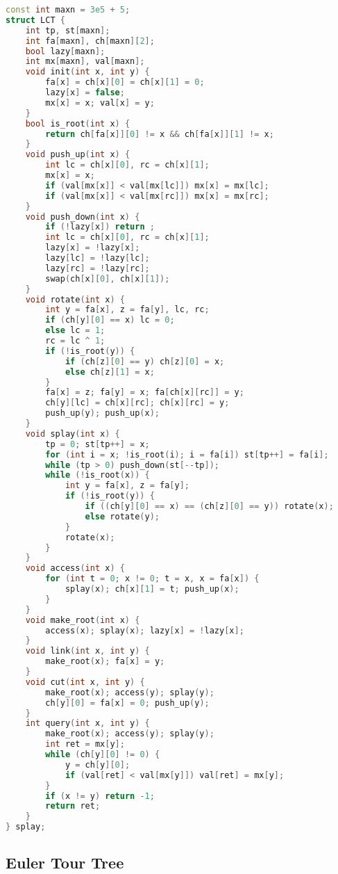 \begin{lstlisting}[language=C++]
const int maxn = 3e5 + 5;
struct LCT {
    int tp, st[maxn];
    int fa[maxn], ch[maxn][2];
    bool lazy[maxn];
    int mx[maxn], val[maxn];
    void init(int x, int y) {
        fa[x] = ch[x][0] = ch[x][1] = 0;
        lazy[x] = false;
        mx[x] = x; val[x] = y;
    }
    bool is_root(int x) {
        return ch[fa[x]][0] != x && ch[fa[x]][1] != x;
    }
    void push_up(int x) {
        int lc = ch[x][0], rc = ch[x][1];
        mx[x] = x;
        if (val[mx[x]] < val[mx[lc]]) mx[x] = mx[lc];
        if (val[mx[x]] < val[mx[rc]]) mx[x] = mx[rc];
    }
    void push_down(int x) {
        if (!lazy[x]) return ;
        int lc = ch[x][0], rc = ch[x][1];
        lazy[x] = !lazy[x];
        lazy[lc] = !lazy[lc];
        lazy[rc] = !lazy[rc];
        swap(ch[x][0], ch[x][1]);
    }
    void rotate(int x) {
        int y = fa[x], z = fa[y], lc, rc;
        if (ch[y][0] == x) lc = 0;
        else lc = 1;
        rc = lc ^ 1;
        if (!is_root(y)) {
            if (ch[z][0] == y) ch[z][0] = x;
            else ch[z][1] = x;
        }
        fa[x] = z; fa[y] = x; fa[ch[x][rc]] = y;
        ch[y][lc] = ch[x][rc]; ch[x][rc] = y;
        push_up(y); push_up(x);
    }
    void splay(int x) {
        tp = 0; st[tp++] = x;
        for (int i = x; !is_root(i); i = fa[i]) st[tp++] = fa[i];
        while (tp > 0) push_down(st[--tp]);
        while (!is_root(x)) {
            int y = fa[x], z = fa[y];
            if (!is_root(y)) {
                if ((ch[y][0] == x) == (ch[z][0] == y)) rotate(x);
                else rotate(y);
            }
            rotate(x);
        }
    }
    void access(int x) {
        for (int t = 0; x != 0; t = x, x = fa[x]) {
            splay(x); ch[x][1] = t; push_up(x);
        }
    }
    void make_root(int x) {
        access(x); splay(x); lazy[x] = !lazy[x];
    }
    void link(int x, int y) {
        make_root(x); fa[x] = y;
    }
    void cut(int x, int y) {
        make_root(x); access(y); splay(y);
        ch[y][0] = fa[x] = 0; push_up(y);
    }
    int query(int x, int y) {
        make_root(x); access(y); splay(y);
        int ret = mx[y];
        while (ch[y][0] != 0) {
            y = ch[y][0];
            if (val[ret] < val[mx[y]]) val[ret] = mx[y];
        }
        if (x != y) return -1;
        return ret;
    }
} splay;
\end{lstlisting}

\subsection{Euler Tour Tree}

